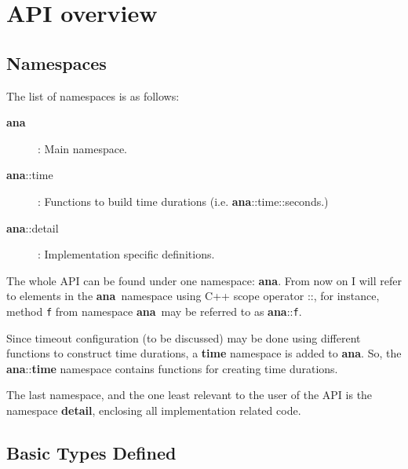 \documentclass[a4paper,12pt,english]{article}
\newcommand{\ana}{\textbf{ana}}
\begin{document}


\section{API overview}

\subsection{Namespaces}

The list of namespaces is as follows:

\begin{description}

\item[\ana] : Main namespace.

\item[\ana::time]   :  Functions  to   build   time  durations
  (i.e. \ana::time::seconds.)

\item[\ana::detail] : Implementation specific definitions. 

\end{description}

The whole  API can be found under  one namespace: \ana. From  now on I
will  refer  to elements  in  the \ana  \  namespace  using C++  scope
operator ::, for instance, method \texttt{f} from namespace \ana \ may
be referred to as \ana::\texttt{f}.

Since  timeout  configuration (to  be  discussed)  may  be done  using
different  functions  to  construct  time durations,  a  \textbf{time}
namespace  is added  to  \ana. So,  the \ana::\textbf{time}  namespace
contains functions for creating time durations.

The last namespace, and the one  least relevant to the user of the API
is the namespace \textbf{detail}, enclosing all implementation related
code.

\subsection{Basic Types Defined}
\end{document}
